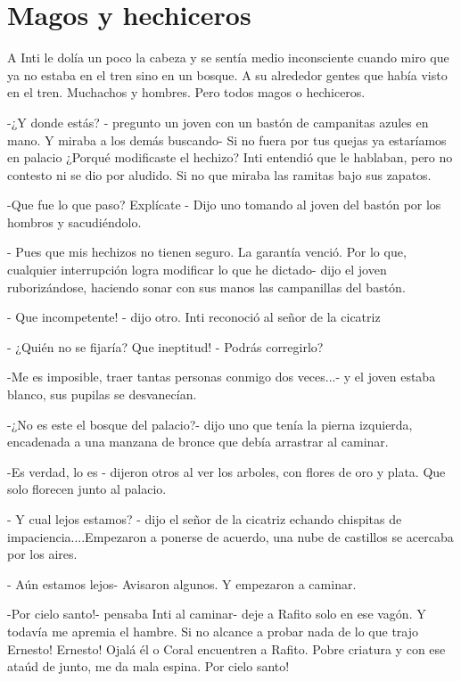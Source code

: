 \chapter{Magos y hechiceros}
A Inti le dolía un poco la cabeza y se sentía medio inconsciente cuando miro que ya no estaba en el tren sino en un bosque. A su alrededor gentes que había visto en el tren. Muchachos y hombres. Pero todos magos o hechiceros.

-¿Y donde estás? - pregunto un joven con un bastón de campanitas azules en mano. Y miraba a los demás buscando- Si no fuera por tus quejas ya estaríamos en palacio ¿Porqué modificaste el hechizo? Inti entendió que le hablaban, pero no contesto ni se dio por aludido. Si no que miraba las ramitas bajo sus zapatos.

-Que fue lo que paso? Explícate - Dijo uno tomando al joven del bastón por los hombros y sacudiéndolo.

- Pues que mis hechizos no tienen seguro. La garantía venció. Por lo que, cualquier interrupción logra modificar lo que he dictado- dijo el joven ruborizándose, haciendo sonar con sus manos las campanillas del bastón.

- Que incompetente! - dijo otro. Inti reconoció al señor de la cicatriz

- ¿Quién no se fijaría? Que ineptitud! - Podrás corregirlo?

-Me es imposible, traer tantas personas conmigo dos veces...- y el joven estaba blanco, sus pupilas se desvanecían.

-¿No es este el bosque del palacio?- dijo uno que tenía la pierna izquierda, encadenada a una manzana de bronce que debía arrastrar al caminar.

-Es verdad, lo es - dijeron otros al ver los arboles, con flores de oro y plata. Que solo florecen junto al palacio.

- Y cual lejos estamos? - dijo el señor de la cicatriz echando chispitas de impaciencia....Empezaron a ponerse de acuerdo, una nube de castillos se acercaba por los aires.

- Aún estamos lejos- Avisaron algunos. Y empezaron a caminar.

-Por cielo santo!- pensaba Inti al caminar- deje a Rafito solo en ese vagón. Y todavía me apremia el hambre. Si no alcance a probar nada de lo que trajo Ernesto! Ernesto! Ojalá él o Coral encuentren a Rafito. Pobre criatura y con ese ataúd de junto, me da mala espina. Por cielo santo!



